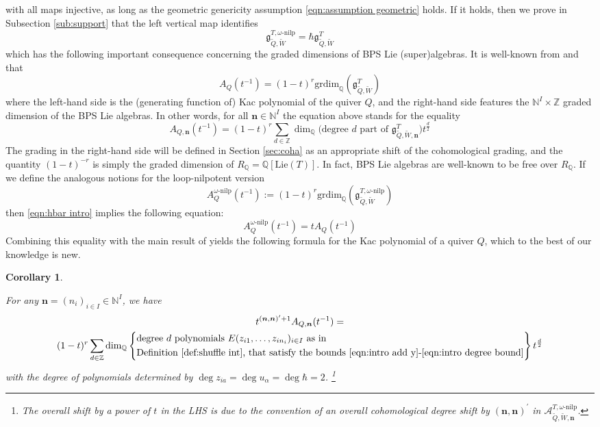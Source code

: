\documentclass{amsart}
\newtheorem{corollary}[theorem]{Corollary}
\def\fg{{\mathfrak{g}}}
\def\BQ{{\mathbb{Q}}}
\def\BZ{{\mathbb{Z}}}
\def\nn{{\mathbb{N}^I}}
\def\bn{{\boldsymbol{n}}}
\def\tQ{\tilde{Q}}
\def\tW{\tilde{W}}
\def\ring{R}
\def\khan{\mathcal{A}^{T,\omega\text{-nilp}}_{\tQ,\tW,\bn}}
\def\tbpsw{\mathfrak{g}^{T,\omega\text{-nilp}}_{\tilde{Q},\tilde{W}}}
\def\tbps{\mathfrak{g}^T_{\tilde{Q},\tilde{W}}}
\begin{document}
with all maps injective, as long as the geometric genericity assumption \eqref{eqn:assumption geometric} holds. If it holds, then we prove in Subsection \ref{sub:support} that the left vertical map identifies
\begin{equation}
\label{eqn:hbar intro}
\tbpsw = \hbar \tbps
\end{equation}
which has the following important consequence concerning the graded dimensions of BPS Lie (super)algebras. It is well-known from \cite{davison2022integrality} and \cite{Mozgovoy} that
$$
A_Q(t^{-1}) = (1-t)^{r} \text{grdim}_{\BQ}(\tbps) 
$$
where the left-hand side is the (generating function of) Kac polynomial of the quiver $Q$, and the right-hand side features the $\nn \times \BZ$ graded dimension of the BPS Lie algebras. In other words, for all $\bn \in \nn$ the equation above stands for the equality
\[ 
A_{Q,\bn}(t^{-1}) = (1-t)^{r} \sum_{d \in \mathbb{Z}} \dim_{\BQ} \Big(\text{degree }d \text{ part of }\fg^T_{\tilde{Q},\tilde{W},\bn} \Big) t^{\frac d2}
\] 
The grading in the right-hand side will be defined in Section \ref{sec:coha} as an appropriate shift of the cohomological grading, and the quantity $(1-t)^{-r}$ is simply the graded dimension of $\ring_{\BQ} = \BQ[\text{Lie}(T)]$. In fact, BPS Lie algebras are well-known to be free over $\ring_{\BQ}$. If we define the analogous notions for the loop-nilpotent version
$$
A^{\omega\text{-nilp}}_Q(t^{-1}) := (1-t)^{r} \text{grdim}_{\BQ}(\tbpsw) 
$$
then \eqref{eqn:hbar intro} implies the following equation:
$$
A^{\omega\text{-nilp}}_Q(t^{-1}) = t A_Q(t^{-1})
$$
Combining this equality with the main result of \cite{jindalnegutbps} yields the following formula for the Kac polynomial of a quiver $Q$, which to the best of our knowledge is new.

\medskip 

\begin{corollary}
\label{cor:kac}

For any $\bn = (n_i)_{i \in I} \in \nn$, we have
\begin{multline}
\label{eqn:kac}
t^{(\bn,\bn)'+1} A_{Q,\bn}(t^{-1}) = \\ (1-t)^r \sum_{d \in \BZ} \dim_{\BQ} \left\{\begin{split} &\text{degree }d\text{ polynomials }E(z_{i1},\dots,z_{in_i})_{i \in I} \text{ as in} \\ &\text{Definition \ref{def:shuffle int}, that satisfy the bounds \eqref{eqn:intro add y}-\eqref{eqn:intro degree bound}} \end{split} \right\} t^{\frac d2}
\end{multline}
with the degree of polynomials determined by $\deg z_{ia} = \deg u_\alpha = \deg \hbar = 2$. \footnote{The overall shift by a power of $t$ in the LHS is due to the convention of an overall cohomological degree shift by $(\bn,\bn)^{\prime}$ in $\khan$.} 

\end{corollary}
\end{document}
